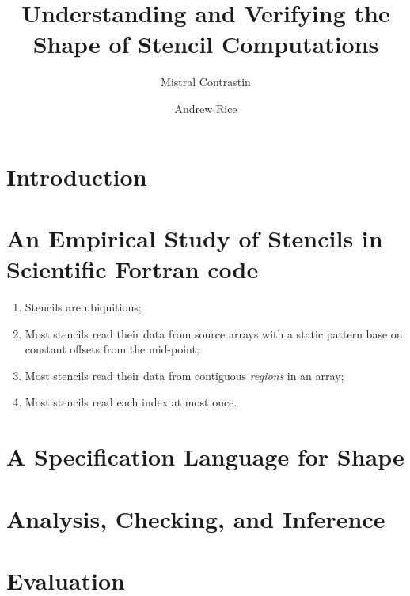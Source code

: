 \documentclass[acmlarge,review,anonymous]{acmart}\settopmatter{printfolios=true}
\begin{document}
\title{Understanding and Verifying the Shape of Stencil Computations}

\author{Mistral Contrastin}

\author{Andrew Rice}

\maketitle

\section{Introduction}

\section{An Empirical Study of Stencils in Scientific Fortran code}

\begin{enumerate}
\item Stencils are ubiquitious;
\item Most stencils read their data from source arrays with a static pattern
base on constant offsets from the mid-point;
\item Most stencils read their data from contiguous \emph{regions} in an array;
\item Most stencils read each index at most once.
\end{enumerate}

\section{A Specification Language for Shape}

\section{Analysis, Checking, and Inference}

\section{Evaluation}


\end{document}
